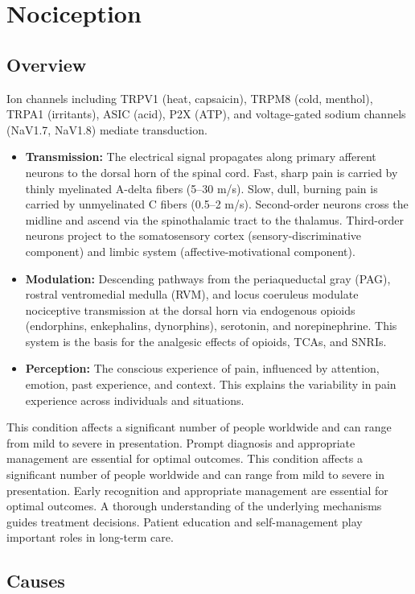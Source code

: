 \chapter{Nociception}
\label{sec:Nociception}

\section{Overview}
Ion channels including TRPV1 (heat, capsaicin), TRPM8 (cold, menthol), TRPA1 (irritants), ASIC (acid), P2X (ATP), and voltage-gated sodium channels (NaV1.7, NaV1.8) mediate transduction.
\begin{itemize}[noitemsep]
  \item \textbf{Transmission:} The electrical signal propagates along primary afferent neurons to the dorsal horn of the spinal cord. Fast, sharp pain is carried by thinly myelinated A-delta fibers (5--30 m/s). Slow, dull, burning pain is carried by unmyelinated C fibers (0.5--2 m/s). Second-order neurons cross the midline and ascend via the spinothalamic tract to the thalamus. Third-order neurons project to the somatosensory cortex (sensory-discriminative component) and limbic system (affective-motivational component).
  \item \textbf{Modulation:} Descending pathways from the periaqueductal gray (PAG), rostral ventromedial medulla (RVM), and locus coeruleus modulate nociceptive transmission at the dorsal horn via endogenous opioids (endorphins, enkephalins, dynorphins), serotonin, and norepinephrine. This system is the basis for the analgesic effects of opioids, TCAs, and SNRIs.
  \item \textbf{Perception:} The conscious experience of pain, influenced by attention, emotion, past experience, and context. This explains the variability in pain experience across individuals and situations.
\end{itemize}
This condition affects a significant number of people worldwide and can range from mild to severe in presentation. Prompt diagnosis and appropriate management are essential for optimal outcomes. This condition affects a significant number of people worldwide and can range from mild to severe in presentation. Early recognition and appropriate management are essential for optimal outcomes. A thorough understanding of the underlying mechanisms guides treatment decisions. Patient education and self-management play important roles in long-term care.
\section{Causes}
